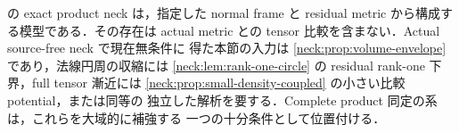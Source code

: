  の exact product neck は，指定した
normal frame と residual metric から構成する模型である．その存在は actual
metric との tensor 比較を含まない．Actual source-free neck で現在無条件に
得た本節の入力は \cref{neck:prop:volume-envelope} であり，法線円周の収縮には
\cref{neck:lem:rank-one-circle} の residual rank-one 下界，full tensor 漸近には
\cref{neck:prop:small-density-coupled} の小さい比較 potential，または同等の
独立した解析を要する．Complete product 同定の系は，これらを大域的に補強する
一つの十分条件として位置付ける．
